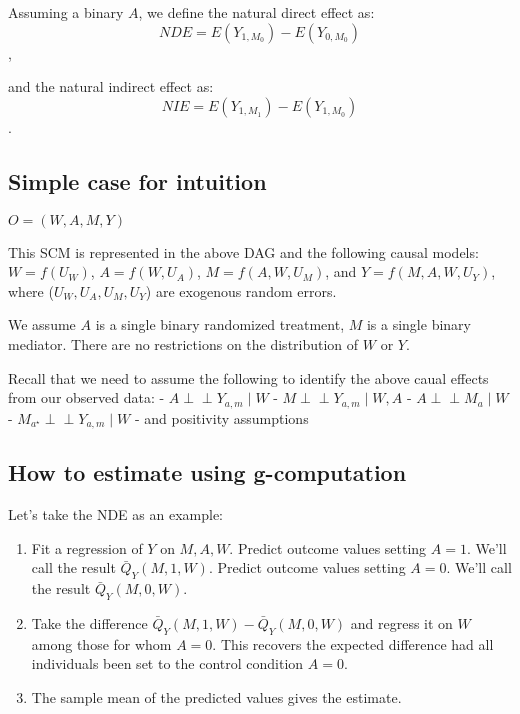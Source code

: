 \documentclass[
  12pt, krantz2,
]{book}
\providecommand{\tightlist}{%
  \setlength{\itemsep}{0pt}\setlength{\parskip}{0pt}}
\theoremstyle{definition}
\theoremstyle{definition}
\theoremstyle{definition}
\newcommand{\indep}{\mbox{$\perp\!\!\!\perp$}}
\newcommand{\1}{\mathbbm{1}}
\begin{document}
Assuming a binary \(A\), we define the natural direct effect as:
\[NDE = E(Y_{1,M_{0}}) - E(Y_{0,M_{0}})\],

and the natural indirect effect as:
\[NIE = E(Y_{1,M_{1}}) - E(Y_{1,M_{0}})\].

\hypertarget{simple-case-for-intuition}{%
\subsection{Simple case for intuition}\label{simple-case-for-intuition}}

\(O=(W, A, M, Y)\)

This SCM is represented in the above DAG and the following causal models:
\(W=f(U_W)\), \(A=f(W,U_A)\), \(M=f(A, W,U_M)\), and \(Y=f(M,A,W,U_Y)\), where (\(U_W, U_A,U_M, U_Y\)) are exogenous random errors.

We assume \(A\) is a single binary randomized treatment, \(M\) is a single binary
mediator. There are no restrictions on the distribution of \(W\) or \(Y\).

Recall that we need to assume the following to identify the above caual effects
from our observed data:
- \(A \indep Y_{a,m} \mid W\)
- \(M \indep Y_{a,m} \mid W, A\)
- \(A \indep M_a \mid W\)
- \(M_{a^{\star}} \indep Y_{a,m} \mid W\)
- and positivity assumptions

\hypertarget{how-to-estimate-using-g-computation}{%
\subsection{How to estimate using g-computation}\label{how-to-estimate-using-g-computation}}

Let's take the NDE as an example:

\begin{enumerate}
\def\labelenumi{\arabic{enumi}.}
\tightlist
\item
  Fit a regression of \(Y\) on \(M,A,W\). Predict outcome values setting \(A=1\).
  We'll call the result \(\bar{Q}_Y(M,1,W)\). Predict outcome values setting
  \(A=0\). We'll call the result \(\bar{Q}_Y(M,0,W)\).
\item
  Take the difference \(\bar{Q}_Y(M,1,W) - \bar{Q}_Y(M,0,W)\) and regress it on
  \(W\) among those for whom \(A=0\). This recovers the expected difference had all
  individuals been set to the control condition \(A = 0\).
\item
  The sample mean of the predicted values gives the estimate.
\end{enumerate}
\end{document}
